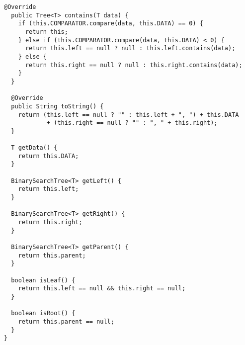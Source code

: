\begin{lstlisting}[language=MyJava]
  @Override
  public Tree<T> contains(T data) {
    if (this.COMPARATOR.compare(data, this.DATA) == 0) {
      return this;
    } else if (this.COMPARATOR.compare(data, this.DATA) < 0) {
      return this.left == null ? null : this.left.contains(data);
    } else {
      return this.right == null ? null : this.right.contains(data);
    }
  }

  @Override
  public String toString() {
    return (this.left == null ? "" : this.left + ", ") + this.DATA
            + (this.right == null ? "" : ", " + this.right);
  }

  T getData() { 
    return this.DATA; 
  }

  BinarySearchTree<T> getLeft() { 
    return this.left; 
  }

  BinarySearchTree<T> getRight() {
    return this.right; 
  }

  BinarySearchTree<T> getParent() { 
    return this.parent; 
  }

  boolean isLeaf() { 
    return this.left == null && this.right == null; 
  }

  boolean isRoot() { 
    return this.parent == null; 
  }
}
\end{lstlisting}